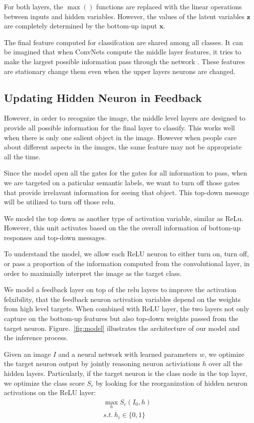 For both layers, the $\max()$ functions are replaced with the linear operations between inputs and hidden variables. However, the values of the latent variables $\mathbf{z}$ are completely determined by the bottom-up input $\mathbf{x}$. 

The final feature computed for classifcation are shared among all classes. It can be imagined that when ConvNets compute the middle layer features, it tries to make the largest possible information pass through the network . These features are stationary change them even when the upper layers neurons are changed.



\subsection{Updating Hidden Neuron in Feedback}
However, in order to recognize the image, the middle level layers are designed to provide all possible information for the final layer to classify. This works well when there is only one salient object in the image. However when people care about different aspects in the images, the same feature may not be appropriate all the time. 

Since the model open all the gates for the gates for all information to pass, when we are targeted on a paticular semantic labels, we want to turn off those gates that provide irrelavant information for seeing that object. This top-down message will be utilized to turn off those relu.

We model the top down as another type of activation variable, similar as ReLu. However, this unit activates based on the the overall information of bottom-up responses and top-down messages. 

To understand the model, we allow each ReLU neuron to either turn on, turn off, or pass a proportion of the information computed from the convolutional layer, in order to maximially interpret the image as the target class.

We model a feedback layer on top of the relu layers to improve the activation felxibility, that the feedback neuron activation variables depend on the weights from high level targets. When combined with ReLU layer, the two layers not only capture on the bottom-up features but also top-down weights passed from the target neuron. Figure.~\ref{fig:model} illustrates the architecture of our model and the inference process. 
 
Given an image $I$ and a neural network with learned parameters $w$, we optimize the target neuron output by jointly reasoning neuron activiations $h$ over all the hidden layers. Particularly, if the target neuron is the class node in the top layer, we optimize the class score $S_c$ by looking for the reorganization of hidden neuron activations on the ReLU layer:
\begin{equation}
\begin{aligned}
  \max_h S_c(I_0, h) \\
  s.t.\ h_i \in \{0, 1\}
\end{aligned}
\end{equation}

